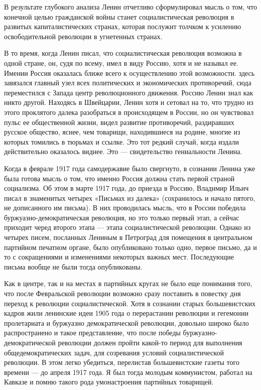 \documentclass[12pt, a4paper, openany]{book}
\begin{document}
В результате глубокого анализа Ленин отчетливо сформулировал мысль о том, что конечной целью гражданской войны станет социалистическая революция в развитых капиталистических странах, которая послужит толчком к усилению освободительной революции в угнетенных странах.

В то время, когда Ленин писал, что социалистическая революция возможна в одной стране, он, судя по всему, имел в виду Россию, хотя и не называл ее. Имении Россия оказалась ближе всего к осуществлению этой возможности. здесь завязался главный узел всех политических и экономических противоречий, сюда переместился с Запада центр революционного движения. Россию Ленин знал как никто другой. Находясь в Швейцарии, Ленин хотя и сетовал на то, что трудно из этого проклятого далека разобраться в происходящем в России, но он чувствовал пульс ее общественной жизни, видел развитие противоречий, раздиравших русское общество, яснее, чем товарищи, находившиеся на родине, многие из которых томились в тюрьмах и ссылке. Это тот редкий случай, когда издали действительно оказалось виднее. Это — свидетельство гениальности Ленина.

Когда в феврале 1917 года самодержавие было свергнуто, в сознании Ленина уже была готова мысль о том, что именно Россия должна стать первой страной социализма. Об этом в марте 1917 года, до приезда в Россию, Владимир Ильич писал в знаменитых четырех «Письмах из далека» (сохранилось и начало пятого, не дописанного им письма). В них проводилась мысль, что в России победила буржуазно-демократическая революция, но это только первый этап, а сейчас приходит черед второго этапа — этапа социалистической революции. Однако из четырех писем, посланных Лениным в Петроград для помещения в центральном партийном печатном органе, было опубликовано только одно, первое письмо, да и то с сокращениями и изменениями некоторых важных мест. Последующие письма вообще не были тогда опубликованы.

Как в центре, так и на местах в партийных кругах не было еще понимания того, что после Февральской революции возможно сразу поставить в повестку дня переход к революции социалистической. Хотя в сознании старых большевистских кадров жили ленинские идеи 1905 года о перерастании революции и гегемонии пролетариата и буржуазно демократической революции, довольно широко было распространено и такое представление, что после победы буржуазно-демократической революции должен пройти какой-то период для выполнения общедемократических задач, для созревания условий социалистической революции. В этом легко убедиться, перелистав большевистские газеты того времени — до апреля 1917 года. Я был тогда молодым коммунистом, работал на Кавказе и помню такого рода умонастроения партийных товарищей.
\end{document}
